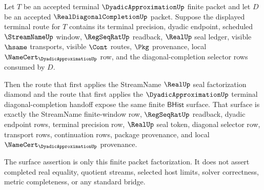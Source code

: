 \begin{theorem}
\label{thm:dyadicapproximation-finite-packet-streamname-real-seal-factorization}
Let $T$ be an accepted terminal $\DyadicApproximationUp$ finite packet and let
$D$ be an accepted $\RealDiagonalCompletionUp$ packet. Suppose the displayed
terminal route for $T$ contains its terminal precision, dyadic endpoint,
scheduled $\StreamNameUp$ window, $\RegSeqRatUp$ readback, $\RealUp$ seal
ledger, visible $\hsame$ transports, visible $\Cont$ routes, $\Pkg$
provenance, local $\NameCert_{\DyadicApproximationUp}$ row, and the
diagonal-completion selector rows consumed by $D$.

Then the route that first applies the StreamName $\RealUp$ seal factorization
diamond and the route that first applies the $\DyadicApproximationUp$ terminal
diagonal-completion handoff expose the same finite $\mathsf{BHist}$ surface.
That surface is exactly the StreamName finite-window row, $\RegSeqRatUp$
readback, dyadic endpoint rows, terminal precision row, $\RealUp$ seal token,
diagonal selector row, transport rows, continuation rows, package provenance,
and local $\NameCert_{\DyadicApproximationUp}$ provenance.

The surface assertion is only this finite packet factorization. It does not
assert completed real equality, quotient streams, selected host limits, solver
correctness, metric completeness, or any standard bridge.
\end{theorem}
